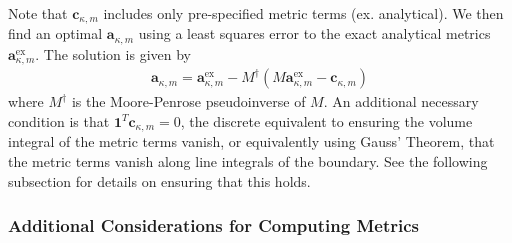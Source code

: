 \documentclass[12pt,a4paper]{article}
\begin{document}
Note that $\bm{c}_{\kappa , m}$ includes only pre-specified metric terms (ex. analytical). We then find an optimal $\bm{a}_{\kappa , m}$ using a least squares error to the exact analytical metrics $\bm{a}_{\kappa , m}^\text{ex}$. The solution is given by
\begin{align*}
\bm{a}_{\kappa , m} = \bm{a}_{\kappa , m}^\text{ex} - M^\dagger \left( M \bm{a}_{\kappa , m}^\text{ex} - \bm{c}_{\kappa , m} \right)
\end{align*}
where $M^\dagger $ is the Moore-Penrose pseudoinverse of $M$. An additional necessary condition is that $\bm{1}^T \bm{c}_{\kappa, m} = 0$, the discrete equivalent to ensuring the volume integral of the metric terms vanish, or equivalently using Gauss' Theorem, that the metric terms vanish along line integrals of the boundary. See the following subsection for details on ensuring that this holds.

\subsubsection{Additional Considerations for Computing Metrics}
\end{document}
